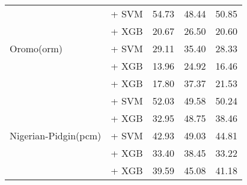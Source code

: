 \begin{longtable}{p{4cm}p{6cm}ccc}
    \midrule
    \multirow{5}{*}{Oromo(orm)}           & \citep{wang2024multilingual} + SVM                                     & 54.73                                & 48.44              & 50.85             \\
                                          & \citep{feng2022languageagnosticbertsentenceembedding} + XGB            & 20.67                                & 26.50              & 20.60             \\
                                          & \citep{feng2022languageagnosticbertsentenceembedding} + SVM            & 29.11                                & 35.40              & 28.33             \\
                                          & \citep{all-MiniLM-L12-v2} + XGB                                        & 13.96                                & 24.92              & 16.46             \\
                                          & \citep{sturua2024jinaembeddingsv3multilingualembeddingstask} + XGB     & 17.80                                & 37.37              & 21.53             \\

    \midrule
    \multirow{5}{*}{Nigerian-Pidgin(pcm)} & \citep{wang2024multilingual} + SVM                                     & 52.03                                & 49.58              & 50.24             \\
                                          & \citep{feng2022languageagnosticbertsentenceembedding} + XGB            & 32.95                                & 48.75              & 38.46             \\
                                          & \citep{feng2022languageagnosticbertsentenceembedding} + SVM            & 42.93                                & 49.03              & 44.81             \\
                                          & \citep{all-MiniLM-L12-v2} + XGB                                        & 33.40                                & 38.45              & 33.22             \\
                                          & \citep{sturua2024jinaembeddingsv3multilingualembeddingstask} + XGB     & 39.59                                & 45.08              & 41.18             \\


\end{longtable}
